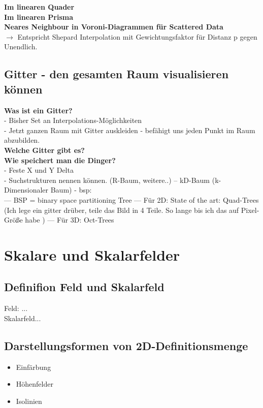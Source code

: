 \documentclass{article}
\begin{document}
\noindent \textbf{Im linearen Quader}\\

\noindent \textbf{Im linearen Prisma}\\

\noindent \textbf{Neares Neighbour in Voroni-Diagrammen für Scattered Data}\\
$\rightarrow$ Entspricht Shepard Interpolation mit Gewichtungsfaktor für Distanz p gegen Unendlich.
	
\subsection{Gitter - den gesamten Raum visualisieren können}
\noindent \textbf{Was ist ein Gitter?}\\
- Bisher Set an Interpolations-Möglichkeiten\\
- Jetzt ganzen Raum mit Gitter auskleiden - befähigt uns jeden Punkt im Raum abzubilden.\\

\noindent \textbf{Welche Gitter gibt es?}\\

\noindent \textbf{Wie speichert man die Dinger?}\\
- Feste X und Y Delta\\
- Suchstrukturen nennen können. (R-Baum, weitere..)
-- kD-Baum (k-Dimensionaler Baum) - bsp:\\
--- BSP = binary space partitioning Tree
--- Für 2D:  State of the art: Quad-Trees (Ich lege ein gitter drüber, teile das Bild in 4 Teile. So lange bis ich das auf Pixel-Größe habe )
--- Für 3D: Oct-Trees
\pagebreak

\section{Skalare und Skalarfelder}

\subsection{Definifion Feld und Skalarfeld}
Feld: ...\\
Skalarfeld...

\subsection{Darstellungsformen von 2D-Definitionsmenge}
\begin{itemize}[noitemsep]
	\item Einfärbung
	\item Höhenfelder
	\item Isolinien
\end{itemize}
\end{document}
